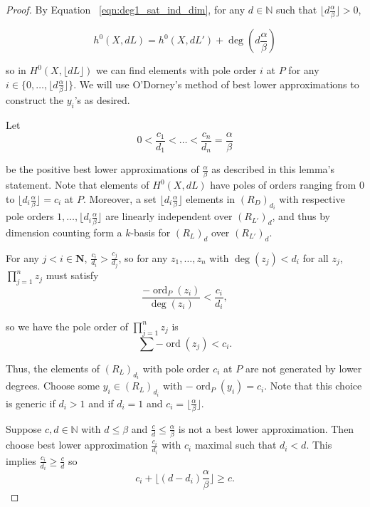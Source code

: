 \documentclass{amsart}
\theoremstyle{plain}
\theoremstyle{definition}
\theoremstyle{remark}
\numberwithin{equation}{section}
\DeclareMathOperator{\ord}{ord}
\newcommand \halfcan{L}
\begin{document}
\begin{proof}
By
Equation ~\ref{eqn:deg1_sat_ind_dim}, for any $d
\in \mathbb{N}$ such that $\lfloor d \frac{ \alpha}{\beta} \rfloor > 0$,

\[
	h^0 (X, d \halfcan ) = h^0(X, d\halfcan') + \deg(d\frac{\alpha}{\beta})
\]

\noindent
{} so in $H^0 (X, \lfloor d\halfcan \rfloor)$ we can find elements with pole
order $i$ at $P$ for any $i \in \{0, \ldots, \lfloor d \frac{\alpha}{
\beta} \rfloor \}$. We will use O'Dorney's method of best lower approximations to
construct the $y_i$'s as desired.  

Let 
\[
	0 < \frac{c_1}{d_1} < \ldots < \frac{c_n}{d_n} = \frac{\alpha}{
	\beta}
\]

\noindent
be the positive best lower approximations of $\frac{
\alpha}{\beta}$ as described in this lemma's statement. Note that elements of $H^0(X, d\halfcan)$ have poles of
orders ranging from 0 to $\lfloor d_i \frac{\alpha}{\beta}\rfloor =
c_i $ at $P$.  Moreover, a set $\lfloor d_i \frac{\alpha}{\beta}\rfloor$ elements in $(R_{D})_{d_i}$ with respective pole orders $1, \ldots, \lfloor
d_i \frac{\alpha}{\beta} \rfloor$ are linearly independent over $(R_{\halfcan'})_d$, and thus by dimension counting form a $k$-basis for
$(R_{\halfcan})_d$ over $(R_{\halfcan'})_d$.

For any $j < i \in \mathbf{N}$, $\frac{c_i}{d_i} > \frac{c_j}{d_j}$, so for any $z_1, \ldots, z_n$ with $\deg(z_j)<d_i$ for all $z_j$, $\prod_{j=1}^n z_j$ must satisfy
\[
	\frac{-\ord_P(z_i)}{\deg(z_i)} < \frac{c_i}{d_i},
\]

\noindent
so we have the pole order of $\prod_{j=1}^n z_j$ is 
\[
	\sum -\ord(z_j) < c_i .
\]

\noindent
Thus, the elements of $(R_{\halfcan})_{d_i}$ with pole order $c_i$ at $P$ are not generated by 
lower degrees. 
Choose some $y_i \in(R_{
\halfcan})_{d_i}$ with $-\ord_{P}(y_i)=c_i$.  Note that this choice is generic if $d_i>1$ and if $d_i=1$ and $c_i=\lfloor \frac{\alpha}{\beta}\rfloor$. 

Suppose $c,d\in \mathbb{N}$ with $d\le \beta$ and $\frac{c}{d} \le \frac{\alpha}{
\beta}$ is not a best lower approximation. Then choose
best lower approximation $\frac{c_i}{d_i}$ with $c_i$ maximal such that $d_i< d$.  This implies $\frac{c_i}{d_i}\ge \frac{c}{d}$ so 
\[
	c_i +\lfloor (d-d_i) \frac{\alpha}{\beta} \rfloor \ge c.
\]


\end{proof}
\end{document}
